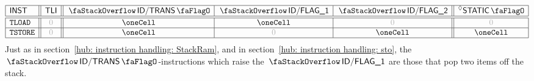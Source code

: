 \[
\begin{array}{|l||c||c|c|c||c|}
	\hline
	\INST         & \tli  & \stackDecTransFlag & \decFlag{1} & \decFlag{2} & \decStaticInst \\ \hline\hline
	\inst{TLOAD}  & \zero & \oneCell           & \oneCell    & \zero       & \zero          \\ \hline
	\inst{TSTORE} & \zero & \oneCell           & \zero       & \oneCell    & \oneCell       \\ \hline
\end{array}
\]
\saNote{}
Just as in section~\ref{hub: instruction handling: StackRam},
and in section~\ref{hub: instruction handling: sto},
the $\stackDecTransFlag$-instructions which raise the $\decFlag{1}$ are those that pop two items off the stack.
